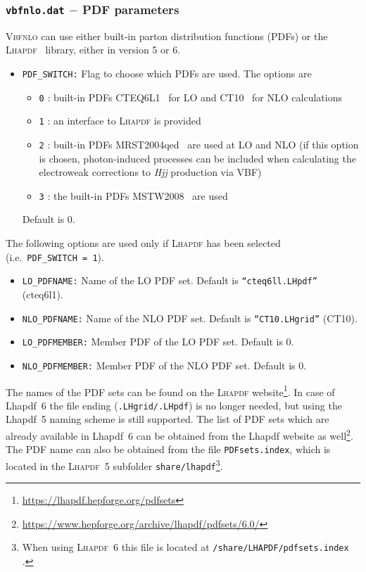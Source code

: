 \documentclass[english,12pt]{article}
\begin{document}
\subsubsection{{\tt vbfnlo.dat} $-$ PDF  parameters}
\label{sec:pdf}
\textsc{Vbfnlo} can use either built-in parton distribution functions (PDFs)
or the \textsc{Lhapdf}~\cite{Whalley:2005nh} library, either in version 5 or 6.  
\begin{itemize}
\item {\tt PDF\_SWITCH:} Flag to choose which PDFs are used. The options are
  \begin{itemize}
    \item {\tt 0} : built-in PDFs CTEQ6L1~\cite{Pumplin:2002vw} for LO and
CT10~\cite{Lai:2010vv} for NLO calculations
    \item {\tt 1} : an interface to \textsc{Lhapdf} is provided
    \item {\tt 2} : built-in PDFs MRST2004qed~\cite{Martin:2004dh} are used at LO and NLO (if this
option is chosen, photon-induced processes can be included when calculating the
electroweak corrections to \textit{Hjj} production via VBF)
    \item {\tt 3} : the built-in PDFs MSTW2008~\cite{Martin:2009iq} are used
   \end{itemize}
 Default is 0.
\end{itemize}

The following options are used only if \textsc{Lhapdf} has been selected (i.e.\ {\tt PDF\_SWITCH~=~1}).
\begin{itemize}
\item {\tt LO\_PDFNAME:} Name of the LO PDF set. Default is {\tt ``cteq6ll.LHpdf''} (cteq6l1). 
\item {\tt NLO\_PDFNAME:} Name of the NLO PDF set. Default is {\tt ``CT10.LHgrid''} (CT10). 
\item {\tt LO\_PDFMEMBER:} Member PDF of the LO PDF set. Default is 0.
\item {\tt NLO\_PDFMEMBER:} Member PDF of the NLO PDF set. Default is 0.
\end{itemize}
The names of the PDF sets can be found on the \textsc{Lhapdf} 
website\footnote{\label{footnote:pdfsets}\url{https://lhapdf.hepforge.org/pdfsets}}.
In case of {\sc Lhapdf}~6 the file ending ({\tt .LHgrid/.LHpdf}) is no longer needed, but using the {\sc Lhapdf}~5 naming
scheme is still supported.
The list of PDF sets which are already available in {\sc Lhapdf}~6 can be obtained from the {\sc Lhapdf} website as
well\footnote{\url{https://www.hepforge.org/archive/lhapdf/pdfsets/6.0/}}.
The PDF name can also be obtained from the file {\tt PDFsets.index}, which is located in the \textsc{Lhapdf}~5 subfolder 
{\tt share/lhapdf}\footnote{\label{footnote:pdfsetsindex}When using \textsc{Lhapdf}~6 this file is located at
{\tt <LHAPDF-PATH>/share/LHAPDF/pdfsets.index} .}.
\end{document}
